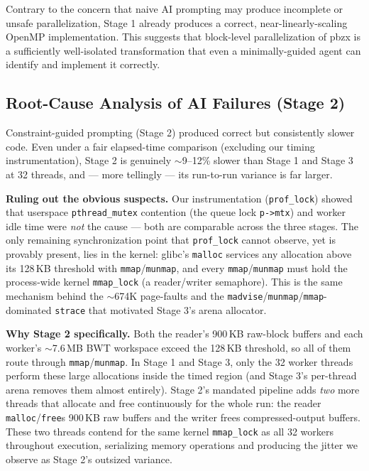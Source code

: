 \documentclass[conference]{IEEEtran}
\begin{document}
Contrary to the concern that naive AI prompting may produce incomplete or unsafe parallelization, Stage 1 already produces a correct, near-linearly-scaling OpenMP implementation. This suggests that block-level parallelization of pbzx is a sufficiently well-isolated transformation that even a minimally-guided agent can identify and implement it correctly.

\subsection{Root-Cause Analysis of AI Failures (Stage 2)}
\label{subsec:stage2-rootcause}
Constraint-guided prompting (Stage 2) produced correct but consistently slower code. Even under a fair elapsed-time comparison (excluding our timing instrumentation), Stage 2 is genuinely $\sim$9--12\% slower than Stage 1 and Stage 3 at 32 threads, and --- more tellingly --- its run-to-run variance is far larger.

\textbf{Ruling out the obvious suspects.} Our instrumentation (\texttt{prof\_lock}) showed that userspace \texttt{pthread\_mutex} contention (the queue lock \texttt{p->mtx}) and worker idle time were \emph{not} the cause --- both are comparable across the three stages. The only remaining synchronization point that \texttt{prof\_lock} cannot observe, yet is provably present, lies in the kernel: glibc's \texttt{malloc} services any allocation above its 128\,KB threshold with \texttt{mmap}/\texttt{munmap}, and every \texttt{mmap}/\texttt{munmap} must hold the process-wide kernel \texttt{mmap\_lock} (a reader/writer semaphore). This is the same mechanism behind the $\sim$674K page-faults and the \texttt{madvise}/\texttt{munmap}/\texttt{mmap}-dominated \texttt{strace} that motivated Stage 3's arena allocator.

\textbf{Why Stage 2 specifically.} Both the reader's 900\,KB raw-block buffers and each worker's $\sim$7.6\,MB BWT workspace exceed the 128\,KB threshold, so all of them route through \texttt{mmap}/\texttt{munmap}. In Stage 1 and Stage 3, only the 32 worker threads perform these large allocations inside the timed region (and Stage 3's per-thread arena removes them almost entirely). Stage 2's mandated pipeline adds \emph{two} more threads that allocate and free continuously for the whole run: the reader \texttt{malloc}/\texttt{free}s 900\,KB raw buffers and the writer frees compressed-output buffers. These two threads contend for the same kernel \texttt{mmap\_lock} as all 32 workers throughout execution, serializing memory operations and producing the jitter we observe as Stage 2's outsized variance.
\end{document}
